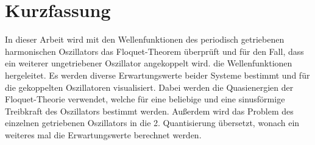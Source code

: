 \thispagestyle{plain}
\iffalse
\section*{Kurzfassung}
Hier steht eine Kurzfassung der Arbeit in deutscher Sprache inklusive der Zusammenfassung der
Ergebnisse.
Zusammen mit der englischen Zusammenfassung muss sie auf diese Seite passen.

\section*{Abstract}
\begin{english}
The abstract is a short summary of the thesis in English, together with the German summary it has to fit on this page.
\end{english}
\fi

\section*{Kurzfassung}
In dieser Arbeit wird mit den Wellenfunktionen des periodisch getriebenen harmonischen Oszillators das Floquet-Theorem überprüft und für den Fall, dass ein weiterer ungetriebener Oszillator angekoppelt wird. die Wellenfunktionen hergeleitet.
Es werden diverse Erwartungswerte beider Systeme bestimmt und für die gekoppelten Oszillatoren visualisiert.
Dabei werden die Quasienergien der Floquet-Theorie verwendet, welche für eine beliebige und eine sinusförmige Treibkraft des Oszillators bestimmt werden.
Außerdem wird das Problem des einzelnen getriebenen Oszillators in die 2. Quantisierung übersetzt, wonach ein weiteres mal die Erwartungswerte berechnet werden.

